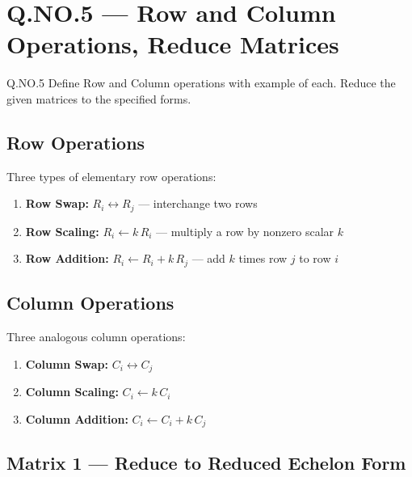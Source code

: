 \documentclass[12pt]{article}
\begin{document}
\newpage

\section{Q.NO.5 — Row and Column Operations, Reduce Matrices}

\begin{qbox}{Q.NO.5}
Define Row and Column operations with example of each. Reduce the given matrices to the specified forms.
\end{qbox}

\subsection{Row Operations}

\begin{defbox}
Three types of elementary row operations:
\begin{enumerate}[leftmargin=20pt, itemsep=3pt]
  \item \textbf{Row Swap:} $R_i \leftrightarrow R_j$ — interchange two rows
  \item \textbf{Row Scaling:} $R_i \leftarrow k\,R_i$ — multiply a row by nonzero scalar $k$
  \item \textbf{Row Addition:} $R_i \leftarrow R_i + k\,R_j$ — add $k$ times row $j$ to row $i$
\end{enumerate}
\end{defbox}

\subsection{Column Operations}

\begin{defbox}
Three analogous column operations:
\begin{enumerate}[leftmargin=20pt, itemsep=3pt]
  \item \textbf{Column Swap:} $C_i \leftrightarrow C_j$
  \item \textbf{Column Scaling:} $C_i \leftarrow k\,C_i$
  \item \textbf{Column Addition:} $C_i \leftarrow C_i + k\,C_j$
\end{enumerate}
\end{defbox}

\subsection{Matrix 1 — Reduce to Reduced Echelon Form}
\end{document}
